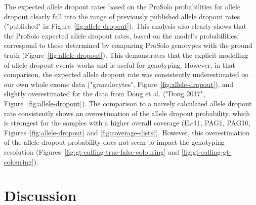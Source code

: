 \documentclass[12pt,inline]{wlscirep}
\begin{document}
The expected allele dropout rates based on the ProSolo probabilities for allele dropout clearly fall into the range of previously published allele dropout rates\cite{wang_clonal_2014,hou_single-cell_2012,xu_single-cell_2012,ling_evaluation_2009,spits_whole-genome_2006,spits_optimization_2006,renwick_proof_2006,lodato_somatic_2015} ("published" in Figure~\ref{fig:allele-dropout}).
This analysis also clearly shows that the ProSolo expected allele dropout rates, based on the model's probabilities, correspond to those determined by comparing ProSolo genotypes with the ground truth (Figure~\ref{fig:allele-dropout}).
This demonstrates that the explicit modelling of allele dropout events works and is useful for genotyping.
However, in that comparison, the expected allele dropout rate was consistently underestimated on our own whole exome data ("granulocytes", Figure~\ref{fig:allele-dropout}), and slightly overestimated for the data from Dong et al.\cite{dong_accurate_2017} ("Dong 2017", Figure~\ref{fig:allele-dropout}).
The comparison to a naively calculated allele dropout rate consistently shows an overestimation of the allele dropout probability, which is strongest for the samples with a higher overall coverage (IL-11, PAG1, PAG10, Figures~\ref{fig:allele-dropout} and \ref{fig:coverage-dists}).
However, this overestimation of the allele dropout probability does not seem to impact the genotyping resolution (Figures~\ref{fig:gt-calling-true-false-colouring} and \ref{fig:gt-calling-gt-colouring}).


\section{Discussion}
\end{document}
